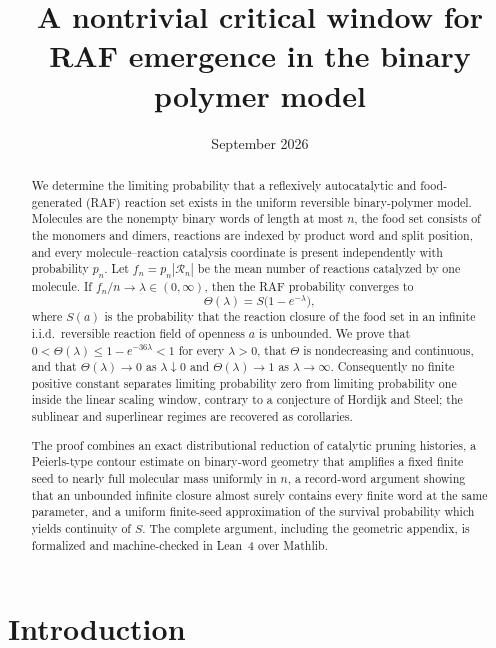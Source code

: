 \documentclass[11pt,reqno]{amsart}
\title[A nontrivial critical window for RAF emergence]{A nontrivial critical window for RAF emergence in the binary polymer model}
\author{\PaperAuthor}
\date{September 2026}
\theoremstyle{plain}
\theoremstyle{definition}
\theoremstyle{remark}
\numberwithin{equation}{section}
\newcommand{\cR}{\mathcal{R}}
\begin{document}
\begin{abstract}
We determine the limiting probability that a reflexively autocatalytic and food-generated (RAF) reaction set exists in the uniform reversible binary-polymer model. Molecules are the nonempty binary words of length at most $n$, the food set consists of the monomers and dimers, reactions are indexed by product word and split position, and every molecule--reaction catalysis coordinate is present independently with probability $p_n$. Let $f_n=p_n|\cR_n|$ be the mean number of reactions catalyzed by one molecule. If $f_n/n\to\lambda\in(0,\infty)$, then the RAF probability converges to
\[
\Theta(\lambda)=S\bigl(1-e^{-\lambda}\bigr),
\]
where $S(a)$ is the probability that the reaction closure of the food set in an infinite i.i.d.\ reversible reaction field of openness $a$ is unbounded. We prove that $0<\Theta(\lambda)\le 1-e^{-36\lambda}<1$ for every $\lambda>0$, that $\Theta$ is nondecreasing and continuous, and that $\Theta(\lambda)\to0$ as $\lambda\downarrow0$ and $\Theta(\lambda)\to1$ as $\lambda\to\infty$. Consequently no finite positive constant separates limiting probability zero from limiting probability one inside the linear scaling window, contrary to a conjecture of Hordijk and Steel; the sublinear and superlinear regimes are recovered as corollaries.

The proof combines an exact distributional reduction of catalytic pruning histories, a Peierls-type contour estimate on binary-word geometry that amplifies a fixed finite seed to nearly full molecular mass uniformly in $n$, a record-word argument showing that an unbounded infinite closure almost surely contains every finite word at the same parameter, and a uniform finite-seed approximation of the survival probability which yields continuity of $S$. The complete argument, including the geometric appendix, is formalized and machine-checked in Lean~4 over Mathlib.
\end{abstract}

\maketitle

\section{Introduction}\label{sec:intro}
\end{document}
